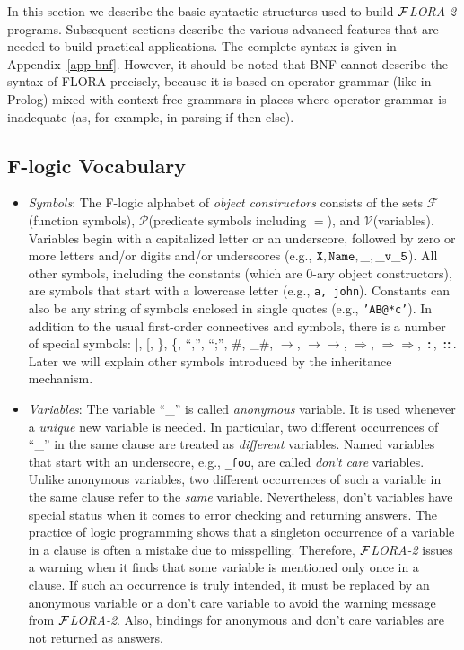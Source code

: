 \documentclass[11pt]{article}
\newcommand{\isa}{\,{\bf{:}}\,}
\newcommand{\subcl}{\,{\bf{::}}\,}
\newcommand{\fd}{\ensuremath{{\rightarrow}}}                   %
\newcommand{\mvd}{\ensuremath{{\rightarrow\!\!\!\!\rightarrow}}}  %
\newcommand{\Fd}{\ensuremath{{\Rightarrow}}}                      %
\newcommand{\Mvd}{\ensuremath{{\Rightarrow\!\!\!\!\Rightarrow}}}  %
\newcommand{\FLORA}{{\mbox{${\cal F}${\small\it LORA}\rm\emph{-2}}}\xspace}
\newcommand{\fl}{\mbox{F-logic}\xspace}
\newcommand{\funcs}{\ensuremath{\mathcal{F}}}
\newcommand{\preds}{\ensuremath{\mathcal{P}}}
\newcommand{\vars}{\ensuremath{\mathcal{V}}}
\begin{document}
In this section we describe the basic syntactic structures used to build
\FLORA programs. Subsequent sections describe the various advanced features
that are needed to build practical applications. The complete syntax is
given in Appendix~\ref{app-bnf}. However, it should be noted that BNF
cannot describe the syntax of FLORA precisely, because it is based on
operator grammar (like in Prolog) mixed with context free grammars in
places where operator grammar is inadequate (as, for example, in parsing
if-then-else).


\subsection{\fl Vocabulary}\label{sec-basic-flogic}


\begin{itemize}
\item \emph{Symbols}: The \fl alphabet of \emph{object constructors}
  consists of the sets \funcs (function symbols), \preds (predicate symbols
  including $=$), and \vars (variables).  Variables begin with a
  capitalized letter or an underscore, followed by zero or more letters
  and/or digits and/or underscores (e.g., $\tt X, Name, \_, \_v\_5$).
  All other symbols, including the constants (which are 0-ary object
  constructors), are symbols that start with a lowercase letter (e.g., {\tt a,
  john}). Constants can also be any string of symbols enclosed in single
  quotes (e.g., {\tt 'AB@*c'}). 
  In addition to the usual first-order connectives and symbols, there is a
  number of special symbols:
  ], [, \}, \{, ``,'', ``;'', \#, \_\#, \fd, \mvd, \Fd,
  \Mvd, \isa, \subcl. Later we will explain other symbols introduced by
  the inheritance mechanism.
  
\item \emph{Variables}: The variable ``\_'' is called \emph{anonymous}
  variable. It is used whenever a \emph{unique} new variable is needed.  In
  particular, two different occurrences of ``\_'' in the same clause are
  treated as \emph{different} variables. Named variables that start with an
  underscore, e.g., {\tt \_foo}, are called \emph{don't care} variables.
  Unlike anonymous variables, two different occurrences of such a variable
  in the same clause refer to the \emph{same} variable. Nevertheless, don't
  variables have special status when it comes to error checking
  and returning answers.  The practice of logic programming shows that a
  singleton occurrence of a variable in a clause is often a mistake due to
  misspelling. Therefore, \FLORA issues a warning when it finds that some
  variable is mentioned only once in a clause. If such an occurrence is
  truly intended, it must be replaced by an anonymous variable or a don't
  care variable to avoid the warning message from \FLORA. Also, bindings
  for anonymous and don't care variables are not returned as answers.


\end{itemize}
\end{document}
